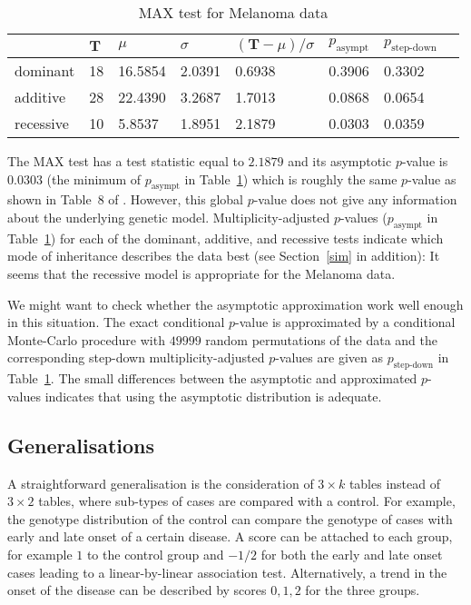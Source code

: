 \documentclass[bimj,fleqn]{w-art}
\newcommand{\T}{\mathbf{T}}
\begin{document}
\begin{table}
\begin{center}
\caption{MAX test for Melanoma data \label{melres}}
\vspace*{0.5cm}
\begin{tabular}{l l l l l l l l}
 & $\T$ & $\mu$ & $ \sigma$ & $(\T - \mu) / \sigma$ & $p_\text{asympt}$ & $p_\text{step-down}$ \\ \hline
dominant  &  18 & 16.5854 & 2.0391 & 0.6938 & 0.3906 & 0.3302 \\ 
additive  &  28 & 22.4390 & 3.2687 & 1.7013 & 0.0868 & 0.0654 \\ 
recessive  &  10 & 5.8537 & 1.8951 & 2.1879 & 0.0303 & 0.0359 \\ \hline
\end{tabular}
\end{center}
\end{table}


The MAX test has a test statistic equal to 
$2.1879$  and its asymptotic $p$-value 
is 0.0303 (the minimum of $p_\text{asympt}$ in
Table~\ref{melres})
which is roughly the same $p$-value as shown in Table~8 of \citet{Freidlin:2002}.
However, this global $p$-value does not give any information about the
underlying genetic model. Multiplicity-adjusted $p$-values
($p_\text{asympt}$ in Table~\ref{melres})
for each of the dominant, additive, and recessive tests indicate
which mode of inheritance describes the data best
(see Section~\ref{sim} in addition):
It seems that the recessive model is appropriate for the Melanoma data.

We might want to check whether the asymptotic approximation work well enough
in this situation. The exact conditional
$p$-value is approximated by a conditional Monte-Carlo procedure
with $49999$ random permutations of the data and the corresponding
step-down multiplicity-adjusted $p$-values \citep{WestfallYoung1993}
are given as $p_\text{step-down}$ in Table~\ref{melres}. The small
differences between the asymptotic and approximated $p$-values 
indicates that using the asymptotic distribution is adequate.

\subsection{Generalisations}

A straightforward generalisation is the consideration of $3 \times k$ tables 
instead of $3 \times 2$ tables, where sub-types of cases are compared 
with a control. For example, the genotype distribution
of the control can compare the genotype
of cases with early and late onset of a certain disease. 
A score can be attached to each group, for example 
$1$ to the control group and $-1/2$ for both the early and late onset
cases leading to a linear-by-linear association test. Alternatively,
a trend in the onset of the disease can be described by scores $0, 1, 2$
for the three groups.
\end{document}
